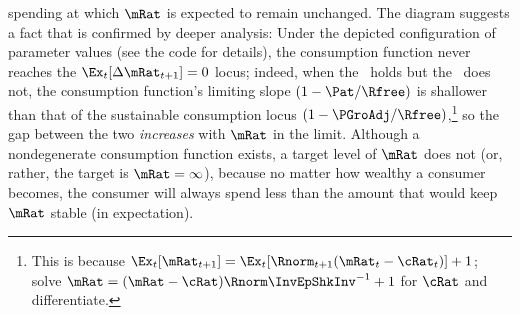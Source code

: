 spending at which $\mRat$ is expected to remain unchanged.  The
diagram suggests a fact that is confirmed by deeper analysis: Under
the depicted configuration of parameter values (see the code for details), the consumption function never reaches the
$\Ex_{t}[\Delta \mRat_{t+1}]=0$ locus; indeed, when the \RIC~holds but
the \GICNrm~does not, the consumption function's limiting slope
$(1-\Pat/\Rfree)$ is shallower than that of the sustainable consumption
locus $(1-\PGroAdj/\Rfree)$,\footnote{This is because
  $\Ex_{t}[\mRat_{t+1}]=\Ex_{t}[\Rnorm_{t+1}(\mRat_{t}-\cRat_{t})]+1$; solve $\mRat = (\mRat - \cRat)\Rnorm \InvEpShkInv^{-1}+1$ for $\cRat$ and differentiate.}
so the gap between the two \textit{increases} with $\mRat$ in the
limit.  Although a nondegenerate consumption function
exists, a target level of $\mRat$ does not (or, rather, the
target is $\mRat=\infty$), because no matter how wealthy a consumer
becomes, the consumer will always spend less than the amount that
would keep $\mRat$ stable (in expectation).

\renewcommand{\figFile}{FVACnotGIC}
\hypertarget{\figFile}{}

